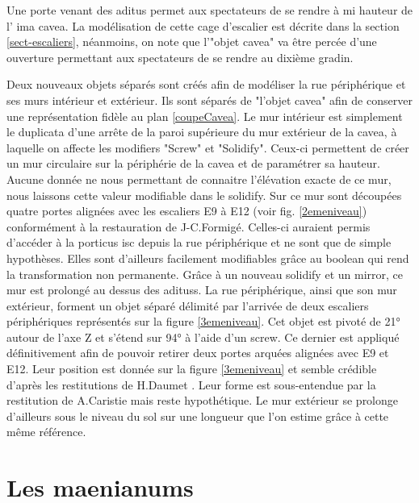 Une porte venant des  \gls{aditus} permet aux spectateurs de se rendre à mi hauteur de l' \gls{ima cavea}. La modélisation de cette cage d'escalier est décrite dans la section \ref{sect-escaliers}, néanmoins, on note que l'"objet cavea" va être percée d'une ouverture permettant aux spectateurs de se rendre au dixième gradin.

Deux nouveaux objets séparés sont créés afin de modéliser la rue périphérique et ses murs intérieur et extérieur. Ils sont séparés de "l'objet cavea" afin de conserver une représentation fidèle au plan \ref{coupeCavea}. Le mur intérieur est simplement le duplicata d'une arrête de la paroi supérieure du mur extérieur de la \gls{cavea}, à laquelle on affecte les \glspl{modifier} "Screw" et "Solidify". Ceux-ci permettent de créer un mur circulaire sur la périphérie de la \gls{cavea} et de paramétrer sa hauteur. Aucune donnée ne nous permettant de connaitre l'élévation exacte de ce mur, nous laissons cette valeur modifiable dans le \gls{solidify}. Sur ce mur sont découpées quatre portes alignées avec les escaliers E9 à E12 (voir fig. \ref{2emeniveau}) conformément à la restauration de J-C.Formigé. Celles-ci auraient permis d'accéder à la \gls{porticus isc} depuis la rue périphérique et ne sont que de simple hypothèses. Elles sont d'ailleurs facilement modifiables grâce au \gls{boolean} qui rend la transformation non permanente. Grâce à un nouveau \gls{solidify} et un \gls{mirror}, ce mur est prolongé au dessus des \glspl{aditus}. La rue périphérique, ainsi que son mur extérieur, forment un objet séparé délimité par l'arrivée de deux escaliers périphériques représentés sur la figure \ref{3emeniveau}. Cet objet est pivoté de 21° autour de l'axe Z et s'étend sur 94° à l'aide d'un \gls{screw}. Ce dernier est appliqué définitivement afin de pouvoir retirer deux portes arquées alignées avec E9 et E12. Leur position est donnée sur la figure \ref{3emeniveau} et semble crédible d'après les restitutions de H.Daumet \cite[Pl. VII]{orangePl}. Leur forme est sous-entendue par la restitution de A.Caristie \cite[Pl. VI]{orangePl} mais reste hypothétique. Le mur extérieur se prolonge d'ailleurs sous le niveau du sol sur une longueur que l'on estime grâce à cette même référence. 


\section{Les  \glspl{maenianum}} \label{sect-maenianum}

